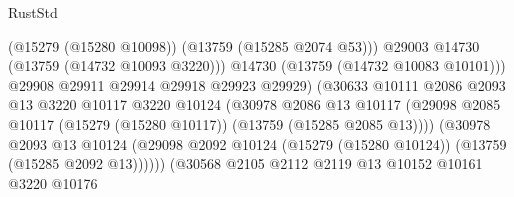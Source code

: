 \begin{lexlean}{RustStd}
\begin{coremodule}
                                                (@15279 (@15280 @10098))
                                                (@13759 (@15285 @2074 @53)))
                                              @29003
                                              @14730
                                              (@13759 (@14732 @10093 @3220)))
                                            @14730
                                            (@13759 (@14732 @10083 @10101)))
                                          @29908
                                          @29911
                                          @29914
                                          @29918
                                          @29923
                                          @29929)
                                        (@30633
                                          @10111
                                          @2086
                                          @2093
                                          @13
                                          @3220
                                          @10117
                                          @3220
                                          @10124
                                          (@30978
                                            @2086
                                            @13
                                            @10117
                                            (@29098
                                              @2085
                                              @10117
                                              (@15279 (@15280 @10117))
                                              (@13759 (@15285 @2085 @13))))
                                          (@30978
                                            @2093
                                            @13
                                            @10124
                                            (@29098
                                              @2092
                                              @10124
                                              (@15279 (@15280 @10124))
                                              (@13759 (@15285 @2092 @13))))))
                                      (@30568
                                        @2105
                                        @2112
                                        @2119
                                        @13
                                        @10152
                                        @10161
                                        @3220
                                        @10176

\end{coremodule}
\end{lexlean}
